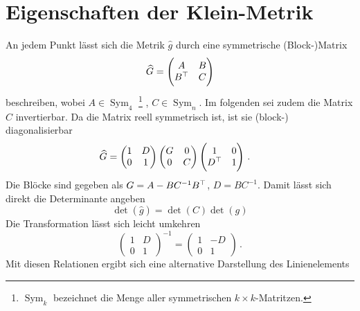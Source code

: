 \section{Eigenschaften der Klein-Metrik}
An jedem Punkt lässt sich die Metrik $\hat{g}$ durch eine symmetrische
(Block-)Matrix
\begin{equation}
\widehat{G}=\begin{pmatrix}A& B\\B^\top&
C\end{pmatrix}
\end{equation}
beschreiben, wobei
$A\in\operatorname{Sym}_4$
\footnote{$\operatorname{Sym}_k$ bezeichnet die Menge aller symmetrischen
$k\times k$-Matritzen.} , $C\in\operatorname{Sym}_n$.
Im folgenden sei zudem die Matrix $C$ invertierbar. 
Da die Matrix reell symmetrisch ist, ist sie (block-) diagonalisierbar
\begin{equation}
\begin{split}
\widehat{G}
&=
\begin{pmatrix}1& D\\0& 1\end{pmatrix}
\begin{pmatrix}G& 0\\0& C
\end{pmatrix}
\begin{pmatrix}1& 0\\D^\top& 1\end{pmatrix}\,.
\end{split}
\end{equation}
Die Blöcke sind gegeben als $G=A-BC^{-1}B^\top$, $D=BC^{-1}$.
Damit lässt sich direkt die Determinante angeben
\begin{equation}
\det(\hat{g})=\det(C)\det(g)
\end{equation}
Die Transformation lässt sich leicht umkehren
\begin{equation}
\begin{pmatrix}1& D\\0& 1\end{pmatrix}^{-1}=\begin{pmatrix}1& -D\\0&
1\end{pmatrix}\,.
\end{equation}
Mit diesen Relationen ergibt sich eine alternative Darstellung des
Linienelements

